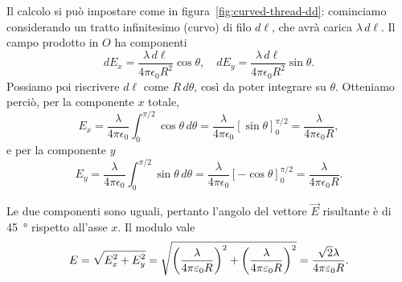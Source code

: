 \documentclass[10pt]{gulartcl}
\begin{document}
\begin{solution}
Il calcolo si può impostare come in figura~\ref{fig:curved-thread-dd}:
cominciamo considerando un tratto infinitesimo (curvo) di filo $d\ell$, che
avrà carica $\lambda \, d\ell$. Il campo prodotto in $O$ ha componenti
\begin{equation}
    dE_x = \frac{\lambda \, d\ell}{4\pi\epsilon_0 R^{2}} \cos\theta, \quad
    dE_y = \frac{\lambda \, d\ell}{4\pi\epsilon_0 R^{2}} \sin\theta.
\end{equation}
Possiamo poi riscrivere $d\ell$ come $R\, d\theta$, così da poter
integrare su $\theta$. Otteniamo perciò, per la componente $x$ totale,
\begin{equation}
    E_x = \frac{\lambda}{4 \pi \epsilon_0} \int_{0}^{\pi/2} \cos\theta \,
    d\theta = \frac{\lambda}{4 \pi \epsilon_0} [\sin\theta]_{0}^{\pi/2} =
    \frac{\lambda}{4\pi\epsilon_0 R},
\end{equation}
e per la componente $y$
\begin{equation}
    E_y = \frac{\lambda}{4 \pi \epsilon_0} \int_{0}^{\pi/2} \sin\theta \,
    d\theta = \frac{\lambda}{4\pi\epsilon_0} [-\cos\theta]_{0}^{\pi/2} =
    \frac{\lambda}{4\pi\epsilon_0 R}.
\end{equation}

Le due componenti sono uguali, pertanto l’angolo del vettore $\vec{E}$
risultante è di \qty{45}{\degree} rispetto all’asse $x$. Il modulo
vale
\begin{equation}
    E = \sqrt{\smash[b]{E_x^{2} + E_y^{2}}} = 
    \sqrt{\left(\frac{\lambda}{4\pi\epsilon_0 R}\right)^{2} +
    \left(\frac{\lambda}{4\pi\epsilon_0 R}\right)^{2}} = \frac{\sqrt{2}
    \lambda}{4 \pi\epsilon_0 R}.
\end{equation}
\end{solution}
\end{document}
